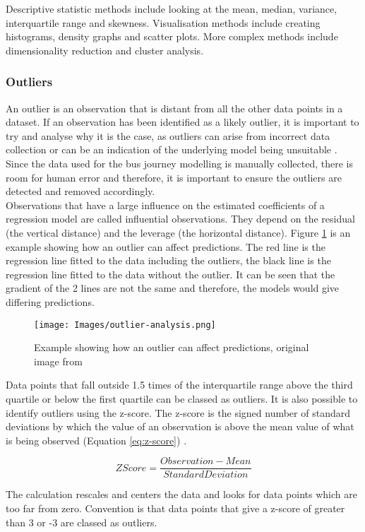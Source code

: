 Descriptive statistic methods include looking at the mean, median, variance, interquartile range and skewness. Visualisation methods include creating histograms, density graphs and scatter plots. More complex methods include dimensionality reduction and cluster analysis. 

\subsubsection{Outliers}

An outlier is an observation that is distant from all the other data points in a dataset. If an observation has been identified as a likely outlier, it is important to try and analyse why it is the case, as outliers can arise from incorrect data collection or can be an indication of the underlying model being unsuitable \cite{forecasting-book}. Since the data used for the bus journey modelling is manually collected, there is room for human error and therefore, it is important to ensure the outliers are detected and removed accordingly. \\

Observations that have a large influence on the estimated coefficients of a regression model are called influential observations. They depend on the residual (the vertical distance) and the leverage (the horizontal distance). Figure \ref{fig:outlier} is an example showing how an outlier can affect predictions. The red line is the regression line fitted to the data including the outliers, the black line is the regression line fitted to the data without the outlier. It can be seen that the gradient of the 2 lines are not the same and therefore, the models would give differing predictions.  

\begin{figure}[H]
\begin{center}
    \texttt{[image: Images/outlier-analysis.png]}
    \caption{Example showing how an outlier can affect predictions, original image from \cite{forecasting-book}}
    \label{fig:outlier}
\end{center}
\end{figure}

Data points that fall outside 1.5 times of the interquartile range above the third quartile or below the first quartile can be classed as outliers. It is also possible to identify outliers using the z-score. The z-score is the signed number of standard deviations by which the value of an observation is above the mean value of what is being observed (Equation \ref{eq:z-score}) \cite{engineering-stats-handbook}. 

\begin{equation}
    \label{eq:z-score}
    Z Score = \frac{Observation - Mean}{Standard Deviation}
\end{equation}

The calculation rescales and centers the data and looks for data points which are too far from zero. Convention is that data points that give a z-score of greater than 3 or -3 are classed as outliers. 

\clearpage
